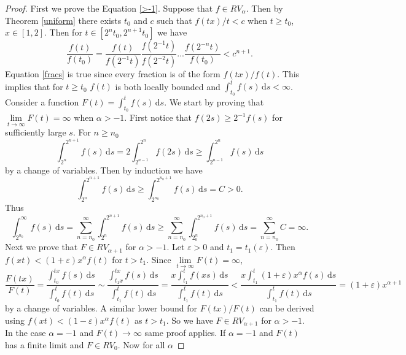 \documentclass[english,12pt,a4paper,pdftex,sci,utf8]{aaltothesis} %
\begin{document}
\begin{proof}
First we prove the Equation \eqref{>-1}. Suppose that $f \in RV_{\alpha}$. Then by Theorem \ref{uniform} there exists $t_0$ and $c$ such that $f(tx)/t<c$ when $t \geq t_0$, $x \in [1,2]$. Then for $t \in [2^nt_0, 2^{n+1}t_0]$ we have
\begin{equation}
\frac{f(t)}{f(t_0)}=\frac{f(t)}{f(2^{-1}t)}\frac{f(2^{-1}t)}{f(2^{-2}t)} ... \frac{f(2^{-n}t)}{f(t_0)} < c^{n+1}.
\label{fracs}
\end{equation}
Equation \eqref{fracs} is true since every fraction is of the form $f(tx)/f(t)$. This implies that for $t\geq t_0$ $f(t)$ is both locally bounded and $\int_{t_0}^{t}f(s) \, \mathrm{d}s<\infty$. Consider a function $F(t) = \int_{t_0}^{t}f(s) \, \mathrm{d}s$. We start by proving that $\lim\limits_{t \rightarrow \infty} F(t) = \infty$ when $\alpha>-1$. First notice that $f(2s) \geq 2^{-1}f(s)$ for sufficiently large $s$. For $n\geq n_0$
\begin{equation}
\int_{2^n}^{2^{n+1}} f(s) \, \mathrm{d}s = 2\int_{2^{n-1}}^{2^{n}} f(2s) \, \mathrm{d}s \geq \int_{2^{n-1}}^{2^n} f(s) \, \mathrm{d}s
\label{varchange}
\end{equation}
by a change of variables. Then by induction we have
\begin{equation}
\int_{2^n}^{2^{n+1}} f(s)\, \mathrm{d}s \geq \int_{2^{n_0}}^{2^{n_0+1}} f(s) \, \mathrm{d}s = C > 0.
\label{induction}
\end{equation}
Thus
\begin{equation}
\int_{2^{n_0}}^{\infty} f(s) \, \mathrm{d}s = \sum_{n=n_0}^{\infty} \int_{2^n}^{2^{n+1}} f(s) \, \mathrm{d}s \geq \sum_{n=n_0}^{\infty} \int_{2^n_0}^{2^{n_0+1}} f(s)\, \mathrm{d}s = \sum_{n=n_0}^{\infty} C = \infty.
\label{infinite}
\end{equation}
Next we prove that $F \in RV_{\alpha+1}$ for $\alpha>-1$. Let $\varepsilon>0$ and $t_1=t_1(\varepsilon)$. Then $f(xt)<(1+\varepsilon)x^{\alpha}f(t)$ for $t>t_1$. Since $\lim\limits_{t \rightarrow \infty} F(t)=\infty$,
\begin{equation*}
\frac{F(tx)}{F(t)} = \frac{\int_{t_0}^{tx} f(s) \, \mathrm{d}s}{\int_{t_0}^{t} f(t)\, \mathrm{d}s} \sim \frac{\int_{t_1x}^{tx} f(s)\, \mathrm{d}s}{\int_{t_1}^{t} f(t)\, \mathrm{d}s}=\frac{x\int_{t_1}^{t} f(xs)\, \mathrm{d}s}{\int_{t_1}^{t} f(t)\, \mathrm{d}s} < \frac{x\int_{t_1}^{t}(1+\varepsilon)x^{\alpha} f(s)\, \mathrm{d}s}{\int_{t_1}^{t} f(t)\, \mathrm{d}s} = (1+ \varepsilon)x^{\alpha+1}
\end{equation*}
by a change of variables. A similar lower bound for $F(tx)/F(t)$ can be derived using $f(xt)<(1-\varepsilon)x^{\alpha}f(t)$ as $t > t_1$. So we have $F \in RV_{\alpha+1}$ for $\alpha>-1$. In the case $\alpha=-1$ and $F(t) \rightarrow \infty$ same proof applies. If $\alpha=-1$ and $F(t)$ has a finite limit and $F \in RV_0$. Now for all $\alpha$

\end{proof}
\end{document}
